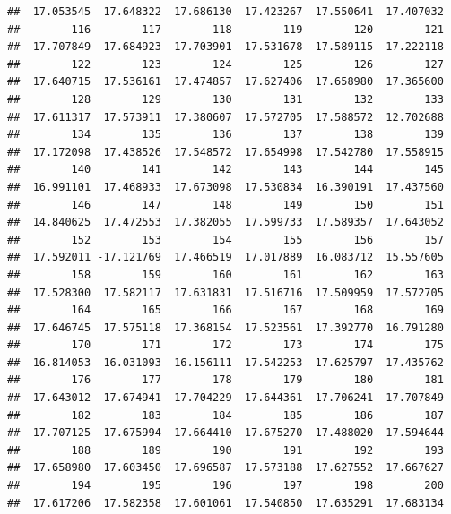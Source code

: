 \documentclass[]{report}
\newenvironment{Shaded}{\begin{snugshade}}{\end{snugshade}}
\newcommand{\KeywordTok}[1]{\textcolor[rgb]{0.13,0.29,0.53}{\textbf{#1}}}
\newcommand{\DataTypeTok}[1]{\textcolor[rgb]{0.13,0.29,0.53}{#1}}
\newcommand{\StringTok}[1]{\textcolor[rgb]{0.31,0.60,0.02}{#1}}
\newcommand{\OperatorTok}[1]{\textcolor[rgb]{0.81,0.36,0.00}{\textbf{#1}}}
\newcommand{\NormalTok}[1]{#1}
\begin{document}
\begin{verbatim}
##  17.053545  17.648322  17.686130  17.423267  17.550641  17.407032 
##        116        117        118        119        120        121 
##  17.707849  17.684923  17.703901  17.531678  17.589115  17.222118 
##        122        123        124        125        126        127 
##  17.640715  17.536161  17.474857  17.627406  17.658980  17.365600 
##        128        129        130        131        132        133 
##  17.611317  17.573911  17.380607  17.572705  17.588572  12.702688 
##        134        135        136        137        138        139 
##  17.172098  17.438526  17.548572  17.654998  17.542780  17.558915 
##        140        141        142        143        144        145 
##  16.991101  17.468933  17.673098  17.530834  16.390191  17.437560 
##        146        147        148        149        150        151 
##  14.840625  17.472553  17.382055  17.599733  17.589357  17.643052 
##        152        153        154        155        156        157 
##  17.592011 -17.121769  17.466519  17.017889  16.083712  15.557605 
##        158        159        160        161        162        163 
##  17.528300  17.582117  17.631831  17.516716  17.509959  17.572705 
##        164        165        166        167        168        169 
##  17.646745  17.575118  17.368154  17.523561  17.392770  16.791280 
##        170        171        172        173        174        175 
##  16.814053  16.031093  16.156111  17.542253  17.625797  17.435762 
##        176        177        178        179        180        181 
##  17.643012  17.674941  17.704229  17.644361  17.706241  17.707849 
##        182        183        184        185        186        187 
##  17.707125  17.675994  17.664410  17.675270  17.488020  17.594644 
##        188        189        190        191        192        193 
##  17.658980  17.603450  17.696587  17.573188  17.627552  17.667627 
##        194        195        196        197        198        200 
##  17.617206  17.582358  17.601061  17.540850  17.635291  17.683134
\end{verbatim}

\begin{Shaded}
\end{Shaded}
\end{document}
